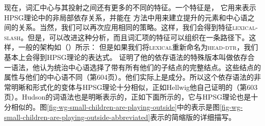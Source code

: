 %
现在，词汇中心与其投射之间还有更多的不同的特征。一个特征是\slaschc， 它用来表示HPSG理论中的非局部依存关系，并能在 \citet{GO2009a}方法中用来建立提升的元素和中心语之间的关系。当然，我们可以再次应用相同的策略。这样，我们会得到特征\textsc{lexical-slash}。但是，可以改进这种分析，而且词汇项的特征可以组织在一条路径下。这样，一般的架构如（）所示：
\ea
{}
\z
但是如果我们将\textsc{lexical}重新命名为\textsc{head-dtr}，我们基本上会得到HPSG理论的表达式。
%
 \citet[]{Hellwig2003a}证明了他的依存语法的特殊版本叫做依存合一语法，他认为统治中心语选择了带有所有他们的子结点的完整结点。这些结点的属性与他们的中心语不同（第604页）。他们实际上是成分。所以这个依存语法的非常明晰和形式化的变体与HPSG理论十分相似，正如Hellwig他自己证明的（第603页）。Hudson的词语法也是明晰表示的，正如下面所示的，它与HPSG理论也是十分相似的。图\vref{fig-wg-small-children-are-playing-outside}中的表示是图\vref{fig-wg-small-children-are-playing-outside-abbreviated}表示的简缩版的详细描写。
%
